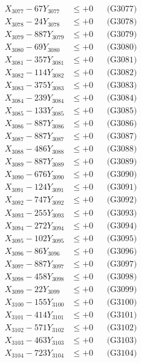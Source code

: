 \documentclass[a4paper,10pt]{article}
\begin{document}
{\begin{align}
X_{3077} - 67Y_{3077} &\leq +0 && \text{(G3077)} \\
X_{3078} - 24Y_{3078} &\leq +0 && \text{(G3078)} \\
X_{3079} - 887Y_{3079} &\leq +0 && \text{(G3079)} \\
X_{3080} - 69Y_{3080} &\leq +0 && \text{(G3080)} \\
\allowbreak
X_{3081} - 357Y_{3081} &\leq +0 && \text{(G3081)} \\
X_{3082} - 114Y_{3082} &\leq +0 && \text{(G3082)} \\
X_{3083} - 375Y_{3083} &\leq +0 && \text{(G3083)} \\
X_{3084} - 239Y_{3084} &\leq +0 && \text{(G3084)} \\
X_{3085} - 133Y_{3085} &\leq +0 && \text{(G3085)} \\
X_{3086} - 887Y_{3086} &\leq +0 && \text{(G3086)} \\
X_{3087} - 887Y_{3087} &\leq +0 && \text{(G3087)} \\
X_{3088} - 486Y_{3088} &\leq +0 && \text{(G3088)} \\
X_{3089} - 887Y_{3089} &\leq +0 && \text{(G3089)} \\
X_{3090} - 676Y_{3090} &\leq +0 && \text{(G3090)} \\
\allowbreak
X_{3091} - 124Y_{3091} &\leq +0 && \text{(G3091)} \\
X_{3092} - 747Y_{3092} &\leq +0 && \text{(G3092)} \\
X_{3093} - 255Y_{3093} &\leq +0 && \text{(G3093)} \\
X_{3094} - 272Y_{3094} &\leq +0 && \text{(G3094)} \\
X_{3095} - 102Y_{3095} &\leq +0 && \text{(G3095)} \\
X_{3096} - 86Y_{3096} &\leq +0 && \text{(G3096)} \\
X_{3097} - 887Y_{3097} &\leq +0 && \text{(G3097)} \\
X_{3098} - 458Y_{3098} &\leq +0 && \text{(G3098)} \\
X_{3099} - 22Y_{3099} &\leq +0 && \text{(G3099)} \\
X_{3100} - 155Y_{3100} &\leq +0 && \text{(G3100)} \\
\allowbreak
X_{3101} - 414Y_{3101} &\leq +0 && \text{(G3101)} \\
X_{3102} - 571Y_{3102} &\leq +0 && \text{(G3102)} \\
X_{3103} - 463Y_{3103} &\leq +0 && \text{(G3103)} \\
X_{3104} - 723Y_{3104} &\leq +0 && \text{(G3104)} \\

\end{align}}
\end{document}
